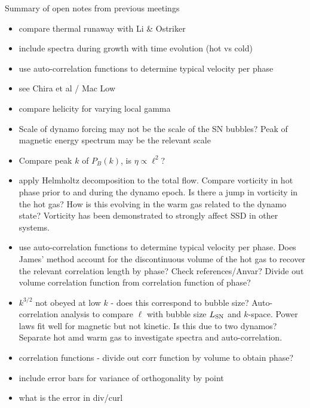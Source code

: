 \documentclass[preprint2]{aastex63}
\begin{document}
Summary of open notes from previous meetings
\begin{itemize} 
\item compare thermal runaway with Li \& Ostriker 
\item include spectra during growth with time evolution (hot vs cold)
\item use auto-correlation functions to determine typical velocity per phase
\item see Chira et al / Mac Low
\item compare helicity for varying local gamma
\item Scale of dynamo forcing may not be the scale of the SN bubbles? Peak of magnetic energy spectrum may be the relevant scale
\item Compare peak $k$ of $P_B(k)$, is $\eta\propto\ell^2$?
\item apply Helmholtz decomposition to the total flow. Compare vorticity in hot
phase prior to and during the dynamo epoch. Is there a jump in vorticity in the
hot gas? How is this evolving in the warm gas related to the dynamo state? 
Vorticity has been demonstrated to strongly affect SSD in other systems.
\item use auto-correlation functions to determine typical velocity per phase.
Does James' method account for the discontinuous volume of the hot gas to
recover the relevant correlation length by phase? Check references/Anvar?
Divide out volume correlation function from correlation function of phase?
\item $k^{3/2}$ not obeyed at low $k$ - does this correspond to bubble size?
Auto-correlation analysis to compare $\ell$ with bubble size $L_{\rm SN}$
and $k$-space.
Power laws fit well for magnetic but not kinetic.
Is this due to two dynamos?
Separate hot amd warm gas to investigate spectra and auto-correlation.
\item correlation functions - divide out corr function by volume to obtain phase?
\item include error bars for variance of orthogonality by point
\item what is the error in div/curl
\end{itemize}
\end{document}
